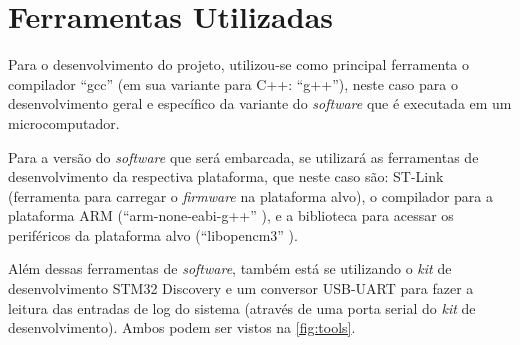 %
%
%
%
%

%
%
%
%
%

\section{Ferramentas Utilizadas} \label{sec:tools}

Para o desenvolvimento do projeto, utilizou-se como principal ferramenta o compilador ``gcc'' \cite{gcc} (em sua variante para C++: ``g++''), neste caso para o desenvolvimento geral e específico da variante do \textit{software} que é executada em um microcomputador.

Para a versão do \textit{software} que será embarcada, se utilizará as ferramentas de desenvolvimento da respectiva plataforma, que neste caso são: ST-Link \cite{stlink} (ferramenta para carregar o \textit{firmware} na plataforma alvo), o compilador para a plataforma ARM (``arm-none-eabi-g++'' \cite{gcc_arm}), e a biblioteca para acessar os periféricos da plataforma alvo (``libopencm3'' \cite{libopencm3}).

Além dessas ferramentas de \textit{software}, também está se utilizando o \textit{kit} de desenvolvimento STM32 Discovery \cite{stm32_discovery} e um conversor USB-UART para fazer a leitura das entradas de log do sistema (através de uma porta serial do \textit{kit} de desenvolvimento). Ambos podem ser vistos na \autoref{fig:tools}.

